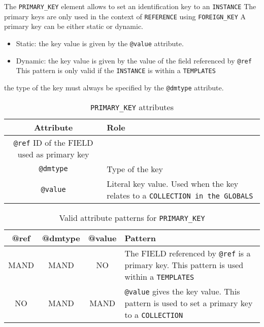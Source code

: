 The \texttt{PRIMARY\_KEY} element allows to set an identification key to an \texttt{INSTANCE}  The primary keys are only used in the context of \texttt{REFERENCE}  using \texttt{FOREIGN\_KEY} 
A primary key can be either static or dynamic.

\begin{itemize}
    \item Static: the key value is given by the \texttt{@value} attribute.
    \item Dynamic: the key value is given by the value of the field referenced by \texttt{@ref}  
    This pattern is only valid if the \texttt{INSTANCE} is within a \texttt{TEMPLATES}  
\end{itemize}

the type of the key must always be specified by the \texttt{@dmtype} attribute. 

\begin{table}[!htbp]
\small
\centering
\begin{tabulary}{\linewidth}{|c|J|}       
       \hline 
            \textbf{Attribute} & 
            \textbf {Role}\\
       \hline         \hline  
            \texttt{@ref}  
            ID of the FIELD used as primary key \\
        \hline 
            \texttt{@dmtype} & 
            Type of the key \\
        \hline 
            \texttt{@value} & 
            Literal key value. Used when the key relates to a \texttt{COLLECTION in the \texttt{GLOBALS}} \\
        \hline 
     \end{tabulary}
     \caption{\texttt{PRIMARY\_KEY} attributes} 
     \label{tbl:primarykey-att}
 \end{table}

\begin{table}[!htbp]
\small
\centering
\begin{tabulary}{\linewidth}{|c|c|c|J|}
    \hline 
        \textbf{@ref} &
        \textbf{@dmtype} &
        \textbf{@value} &
        \textbf{Pattern}\\
    \hline      \hline  
        MAND &           
        MAND &           
        NO &           
        The FIELD referenced by \texttt{@ref} is a primary key. This pattern is used within a \texttt{TEMPLATES} \\
    \hline     
        NO &           
        MAND &           
        MAND &           
        \texttt{@value} gives the key value. This pattern is used to set a primary key to a \texttt{COLLECTION}\\
   \hline 
\end{tabulary}
     \caption{Valid attribute patterns for  \texttt{PRIMARY\_KEY}}
     \label{tbl:primarykey-pattern}
\end{table}
